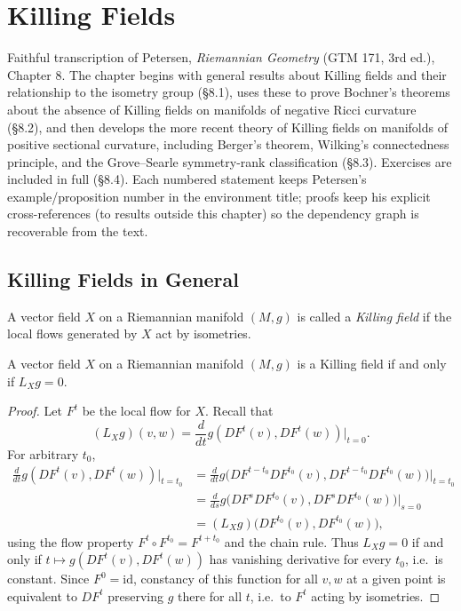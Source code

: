\chapter{Killing Fields}
\label{chap:pet-killing-fields}

Faithful transcription of Petersen, \emph{Riemannian Geometry} (GTM 171, 3rd ed.),
Chapter 8. The chapter begins with general results about Killing fields and their
relationship to the isometry group (\S8.1), uses these to prove Bochner's theorems
about the absence of Killing fields on manifolds of negative Ricci curvature (\S8.2),
and then develops the more recent theory of Killing fields on manifolds of positive
sectional curvature, including Berger's theorem, Wilking's connectedness principle,
and the Grove--Searle symmetry-rank classification (\S8.3). Exercises are included
in full (\S8.4). Each numbered statement keeps Petersen's example/proposition
number in the environment title; proofs keep his explicit cross-references (to
results outside this chapter) so the dependency graph is recoverable from the text.

\section{Killing Fields in General}

\begin{definition}
  \label{def:pet-ch8-killing-field}
  A vector field $X$ on a Riemannian manifold $(M,g)$ is called a \emph{Killing
  field} if the local flows generated by $X$ act by isometries.
\end{definition}

\begin{proposition}[Proposition 8.1.1]
  \label{prop:pet-ch8-killing-lie-derivative}
  A vector field $X$ on a Riemannian manifold $(M,g)$ is a Killing field if and
  only if $L_Xg=0$.
\end{proposition}
\begin{proof}
  Let $F^t$ be the local flow for $X$. Recall that
  \[
    (L_Xg)(v,w)=\frac{d}{dt}g(DF^t(v),DF^t(w))\Big|_{t=0}.
  \]
  For arbitrary $t_0$,
  \begin{align*}
    \frac{d}{dt}g(DF^t(v),DF^t(w))\Big|_{t=t_0}
    &=\frac{d}{dt}g\big(DF^{t-t_0}DF^{t_0}(v),DF^{t-t_0}DF^{t_0}(w)\big)\Big|_{t=t_0}\\
    &=\frac{d}{ds}g\big(DF^sDF^{t_0}(v),DF^sDF^{t_0}(w)\big)\Big|_{s=0}\\
    &=(L_Xg)\big(DF^{t_0}(v),DF^{t_0}(w)\big),
  \end{align*}
  using the flow property $F^t\circ F^{t_0}=F^{t+t_0}$ and the chain rule. Thus
  $L_Xg=0$ if and only if $t\mapsto g(DF^t(v),DF^t(w))$ has vanishing derivative
  for every $t_0$, i.e.\ is constant. Since $F^0=\mathrm{id}$, constancy of this
  function for all $v,w$ at a given point is equivalent to $DF^t$ preserving $g$
  there for all $t$, i.e.\ to $F^t$ acting by isometries.
\end{proof}

